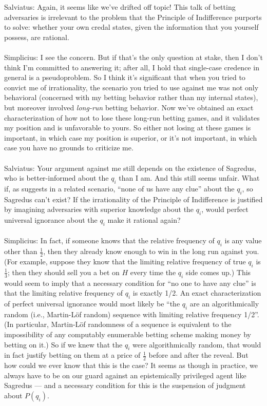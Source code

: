 \documentclass[letterpaper,12pt]{article}
\begin{document}
Salviatus: Again, it seems like we've drifted off topic! This talk of betting adversaries is irrelevant to the problem that the Principle of Indifference purports to solve: whether your own credal states, given the information that you yourself possess, are rational.\\ \\
Simplicius: I see the concern. But if that's the only question at stake, then I don't think I'm committed to answering it; after all, I hold that single-case credence in general is a pseudoproblem. So I think it's significant that when you tried to convict me of irrationality, the scenario you tried to use against me was not only behavioral (concerned with my betting behavior rather than my internal states), but moreover involved \emph{long-run} betting behavior. Now we've obtained an exact characterization of how not to lose these long-run betting games, and it validates my position and is unfavorable to yours. So either not losing at these games is important, in which case my position is superior, or it's not important, in which case you have no grounds to criticize me.\\ \\
Salviatus: Your argument against me still depends on the existence of Sagredus, who is better-informed about the $q_i$ than I am. And this still seems unfair. What if, as \citet[182]{White2009-WHIESA} suggests in a related scenario, ``none of us have any clue'' about the $q_i$, so Sagredus can't exist? If the irrationality of the Principle of Indifference is justified by imagining adversaries with superior knowledge about the $q_i$, would perfect universal ignorance about the $q_i$ make it rational again?\\ \\
Simplicius: In fact, if someone knows that the relative frequency of $q_i$ is any value other than $\frac{1}{2}$, then they already know enough to win in the long run against you. (For example, suppose they know that the limiting relative frequency of true $q_i$ is $\frac{1}{3}$; then they should sell you a bet on $H$ every time the $q_i$ side comes up.) This would seem to imply that a necessary condition for ``no one to have any clue'' is that the limiting relative frequency of $q_i$ is exactly 1/2. An exact characterization of perfect universal ignorance would most likely be ``the $q_i$ are an algorithmically random (i.e., Martin-L\"of random) sequence with limiting relative frequency 1/2''. (In particular, Martin-L\"of randomness of a sequence is equivalent to the impossibility of any computably enumerable betting scheme making money by betting on it.) So if we knew that the $q_i$ were algorithmically random, that would in fact justify betting on them at a price of $\frac{1}{2}$ before and after the reveal. But how could we ever know that this is the case? It seems as though in practice, we always have to be on our guard against an epistemically privileged agent like Sagredus --- and a necessary condition for this is the suspension of judgment about $P(q_i)$.


\end{document}
